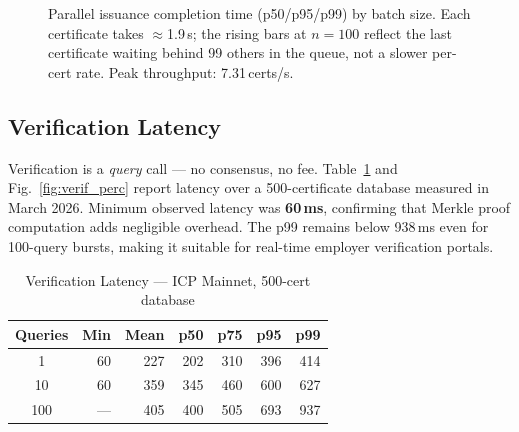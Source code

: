 \documentclass[conference,a4paper]{IEEEtran}
\begin{document}
\begin{figure}[t]
\centering
{}
\caption{Parallel issuance completion time (p50/p95/p99) by batch size. Each certificate takes $\approx$1.9\,s; the rising bars at $n{=}100$ reflect the last certificate waiting behind 99 others in the queue, not a slower per-cert rate. Peak throughput: 7.31\,certs/s.}
\label{fig:issuance_perc}
\end{figure}

\subsection{Verification Latency}
Verification is a \textit{query} call — no consensus, no fee. Table~\ref{tab:verif} and Fig.~\ref{fig:verif_perc} report latency over a 500-certificate database measured in March 2026. Minimum observed latency was \textbf{60\,ms}, confirming that Merkle proof computation adds negligible overhead. The p99 remains below 938\,ms even for 100-query bursts, making it suitable for real-time employer verification portals.

\begin{table}[t]
\caption{Verification Latency --- ICP Mainnet, 500-cert database}
\label{tab:verif}
\centering\small\renewcommand{\arraystretch}{1.1}
\begin{tabular}{@{}crrrrrr@{}}
\toprule
\textbf{Queries} & \textbf{Min} & \textbf{Mean} & \textbf{p50} & \textbf{p75} & \textbf{p95} & \textbf{p99} \\
\midrule
1   & 60  & 227 & 202 & 310 & 396 & 414 \\
10  & 60  & 359 & 345 & 460 & 600 & 627 \\
100 & {---} & 405 & 400 & 505 & 693 & 937 \\
\bottomrule
\end{tabular}
\end{table}
\end{document}

